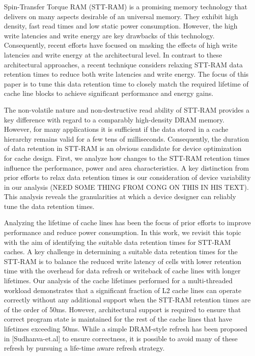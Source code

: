                         
Spin-Transfer Torque RAM (STT-RAM) is a promising memory technology that 
delivers on many aspects desirable of an universal memory. They exhibit
high density, fast read times and low static power consumption. However, 
the high write latencies and write energy are key drawbacks of this
technology. Consequently, recent efforts have focused on masking the 
effects of high write latencies and write energy at the architectural level.
In contrast to these architectural approaches, a recent technique 
considers relaxing STT-RAM data retention times to reduce both write 
latencies and
write energy. The focus of this paper is  to tune this data retention 
time to closely match the required lifetime of cache line blocks to 
achieve significant
performance and energy gains.

The non-volatile nature and non-destructive read ability of  STT-RAM 
provides a key difference with regard to a comparably high-density DRAM 
memory. However, for many applications it is sufficient if the data 
stored in a cache hierarchy remains valid for a few tens of  
milliseconds. Consequently, the duration of data retention in STT-RAM is 
an obvious candidate for device optimization for cache design. First, 
we  analyze how changes to the STT-RAM retention times influence the 
performance, power and area characteristics. A key distinction from 
prior efforts to relax data retention times is our consideration of 
device variability in our analysis (NEED SOME THING FROM CONG ON THIS IN 
HIS TEXT). This analysis reveals the granularities at which a device 
designer can reliably tune the data retention times.

Analyzing the lifetime of cache lines has been the focus of prior 
efforts to improve performance and reduce power consumption. In this 
work, we
revisit this topic with the aim of identifying the suitable data 
retention times for STT-RAM caches. A key challenge in determining a 
suitable
data retention times for the STT-RAM is to balance the reduced write 
latency of cells with lower retention time with the overhead for data 
refresh or
writeback of cache lines with longer lifetimes. Our analysis of the 
cache lifetimes performed for a multi-threaded workload demonstrates 
that a significant fraction of L2 cache lines can operate correctly 
without any additional support when the STT-RAM retention times are of 
the order of 50ms. However, architectural support is required to ensure 
that correct program state is maintained for the rest of the cache lines 
that have lifetimes exceeding 50ms. While a simple
DRAM-style refresh has been proposed in [Sudhanva-et.al] to ensure 
correctness, it is possible to avoid many of these refresh by pursuing a 
life-time aware refresh strategy.

